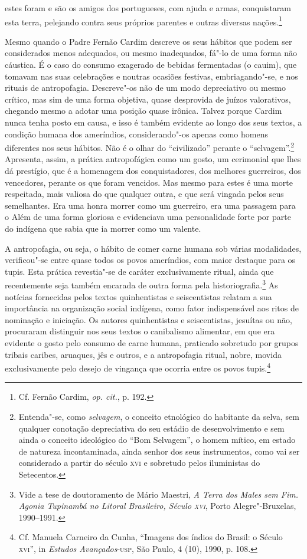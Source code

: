 \begin{hedraquote}
[\ldots{}] estes foram e são os amigos dos portugueses, com ajuda e
armas, conquistaram esta terra, pelejando contra seus próprios parentes
e outras diversas nações.\footnote{ Cf. Fernão Cardim, \textit{op. cit.}, p. 192.}
\end{hedraquote}

 Mesmo quando o Padre Fernão Cardim descreve os seus
hábitos que podem ser considerados menos adequados, ou mesmo
inadequados, fá"-lo de uma forma não cáustica. É o caso do consumo
exagerado de bebidas fermentadas (o cauim), que tomavam nas
suas celebrações e noutras ocasiões festivas, embriagando"-se, e nos
rituais de antropofagia. Descreve"-os não de um modo depreciativo ou
mesmo crítico, mas sim de uma forma objetiva, quase desprovida de
juízos valorativos, chegando mesmo a adotar uma posição quase irônica.
Talvez porque Cardim nunca tenha posto em causa, e isso é também
evidente ao longo dos seus textos, a condição humana dos ameríndios,
considerando"-os apenas como homens diferentes nos seus hábitos. Não é
o olhar do ``civilizado'' perante o ``selvagem''.\footnote{ Entenda"-se, 
como \textit{selvagem}, o conceito etnológico do habitante
da selva, sem qualquer conotação depreciativa do seu estádio de
desenvolvimento e sem ainda o conceito ideológico do ``Bom Selvagem'',
o homem mítico, em estado de natureza incontaminada, ainda senhor dos
seus instrumentos, como vai ser considerado a partir do século \textsc{xvi} e
sobretudo pelos iluministas do Setecentos.} Apresenta, assim, a 
prática antropofágica como um gosto, um cerimonial que lhes dá prestígio, que é a
homenagem dos conquistadores, dos melhores guerreiros, dos vencedores,
perante os que foram vencidos. Mas mesmo para estes é uma morte
respeitada, mais valiosa do que qualquer outra, e que será vingada
pelos seus semelhantes. Era uma honra morrer como um guerreiro, era uma
passagem para o Além de uma forma gloriosa e evidenciava uma
personalidade forte por parte do indígena que sabia que ia morrer como um valente.

 A antropofagia, ou seja, o hábito de comer carne humana sob várias
modalidades, verificou"-se entre quase todos os povos ameríndios, com
maior destaque para os tupis. Esta prática revestia"-se de caráter
exclusivamente ritual, ainda que recentemente seja também encarada de
outra forma pela historiografia.\footnote{ Vide a tese de
doutoramento de Mário Maestri, \textit{A Terra dos Males sem Fim.
Agonia Tupinambá no Litoral Brasileiro, Século \textsc{xvi}}, Porto
Alegre"-Bruxelas, 1990--1991.} As notícias fornecidas pelos textos
quinhentistas e seiscentistas relatam a sua importância na organização
social indígena, como fator indispensável aos ritos de nominação e
iniciação. Os autores quinhentistas e seiscentistas, jesuítas ou não,
procuraram distinguir nos seus textos o canibalismo alimentar, em que
era evidente o gosto pelo consumo de carne humana, praticado sobretudo
por grupos tribais caribes, aruaques, jês e outros, e a antropofagia
ritual, nobre, movida exclusivamente pelo desejo de vingança que
ocorria entre os povos tupis.\footnote{ Cf. Manuela Carneiro da
Cunha, ``Imagens dos índios do Brasil: o Século \textsc{xvi}'', in
\textit{Estudos Avançados}-\textsc{usp}, São Paulo, 4 (10), 1990, p. 108.} 

